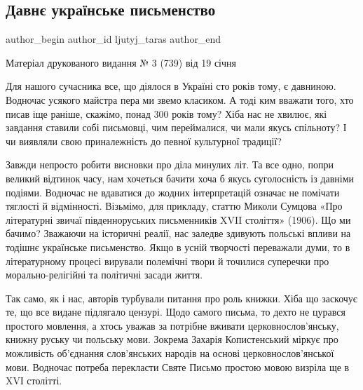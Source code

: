  
 
 
 
 
 
\subsection{Давнє українське письменство}
\label{sec:23_01_2022.stz.news.ua.tyzhden.1.ukr_pysmenstvo}
 
\ifcmt
 author_begin
   author_id ljutyj_taras
 author_end
\fi

Матеріал друкованого видання № 3 (739) від 19 січня

\begin{zznagolos}
Для нашого сучасника все, що діялося в Україні сто років тому, є давниною.
Водночас усякого майстра пера ми звемо класиком. А тоді ким вважати того, хто
писав іще раніше, скажімо, понад 300 років тому? Хіба нас не хвилює, які
завдання ставили собі письмовці, чим переймалися, чи мали якусь спільноту? І чи
виявляли свою приналежність до певної культурної традиції?	
\end{zznagolos}

Завжди непросто робити висновки про діла минулих літ. Та все одно, попри
великий відтинок часу, нам хочеться бачити хоча б якусь суголосність із давніми
подіями. Водночас не вдаватися до жодних інтерпретацій означає не помічати
тяглості й відмінності. Візьмімо, для прикладу, статтю Миколи Сумцова «Про
літературні звичаї південноруських письменників XVII століття» (1906). Що ми
бачимо? Зважаючи на історичні реалії, нас заледве здивують польські впливи на
тодішнє українське письменство. Якщо в усній творчості переважали думи, то в
літературному процесі вирували полемічні твори й точилися суперечки про
морально-релігійні та політичні засади життя. 

Так само, як і нас, авторів турбували питання про роль книжки. Хіба що заскочує
те, що все видане підлягало цензурі. Щодо самого письма, то дехто не цурався
простого мовлення, а хтось уважав за потрібне вживати церковнослов’янську,
книжну руську чи польську мови. Зокрема Захарія Копистенський міркує про
можливість об’єднання слов’янських народів на основі церковнослов’янської мови.
Водночас потреба перекласти Святе Письмо простою мовою визріла ще в XVІ
столітті.

